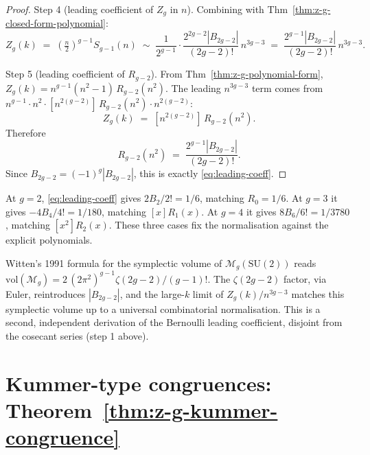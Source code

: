 \begin{proof}
Step 4 (leading coefficient of $Z_g$ in $n$). Combining with
Thm~\ref{thm:z-g-closed-form-polynomial}:
\begin{equation}
Z_g(k) \;=\; \left(\tfrac{n}{2}\right)^{g-1} S_{g-1}(n)
\;\sim\; \frac{1}{2^{g-1}}\cdot \frac{2^{2g-2}|B_{2g-2}|}{(2g-2)!}\,n^{3g-3}
\;=\; \frac{2^{g-1}|B_{2g-2}|}{(2g-2)!}\,n^{3g-3}.
\end{equation}

Step 5 (leading coefficient of $R_{g-2}$). From
Thm~\ref{thm:z-g-polynomial-form}, $Z_g(k) = n^{g-1}(n^2-1)\,R_{g-2}(n^2)$.
The leading $n^{3g-3}$ term comes from $n^{g-1}\cdot n^2 \cdot
[n^{2(g-2)}]\,R_{g-2}(n^2)\cdot n^{2(g-2)}$:
\begin{equation}
[n^{3g-3}]\,Z_g(k) \;=\; [n^{2(g-2)}]\,R_{g-2}(n^2).
\end{equation}
Therefore
\begin{equation}
[n^{2(g-2)}]\,R_{g-2}(n^2)
\;=\;
\frac{2^{g-1}|B_{2g-2}|}{(2g-2)!}.
\end{equation}
Since $B_{2g-2}=(-1)^g|B_{2g-2}|$, this is exactly
\eqref{eq:leading-coeff}. \checkmark
\end{proof}

\begin{remark}
\label{rem:low-genus-bernoulli}
At $g=2$, \eqref{eq:leading-coeff} gives
$2B_2/2!=1/6$, matching $R_0=1/6$. At $g=3$ it gives
$-4B_4/4!=1/180$, matching $[x]R_1(x)$. At $g=4$ it gives
$8B_6/6!=1/3780$, matching $[x^2]R_2(x)$. These three cases fix the
normalisation against the explicit polynomials.
\end{remark}

\begin{remark}
\label{rem:witten-check}
Witten's 1991 formula for the symplectic volume of $\mathcal{M}_g(\mathrm{SU}(2))$
reads $\mathrm{vol}(\mathcal{M}_g) = 2\,(2\pi^2)^{g-1}\zeta(2g-2)/(g-1)!$.
The $\zeta(2g-2)$ factor, via Euler, reintroduces $|B_{2g-2}|$, and the
large-$k$ limit of $Z_g(k)/n^{3g-3}$ matches this symplectic volume up to a
universal combinatorial normalisation. This is a second, independent
derivation of the Bernoulli leading coefficient, disjoint from the cosecant
series (step 1 above).
\end{remark}

\section{Kummer-type congruences: Theorem~\ref{thm:z-g-kummer-congruence}}

